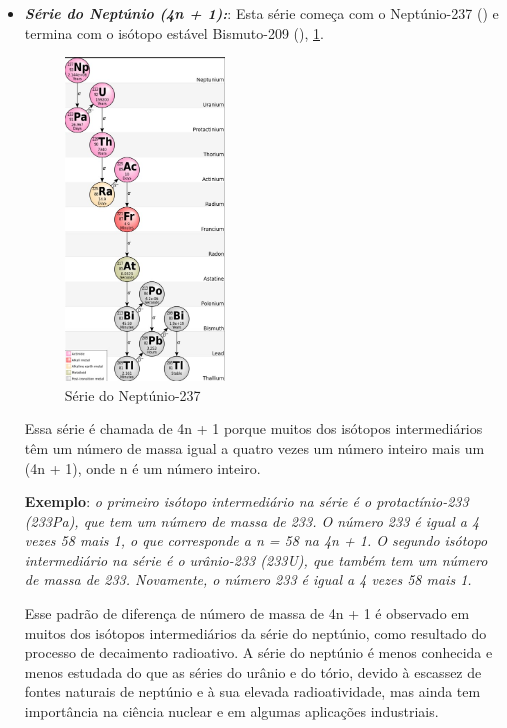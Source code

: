 \documentclass[11pt,a4paper]{article}
\begin{document}
\begin{itemize}
        \item \textbf{\textit{\textcolor{CarnationPink}{Série do Neptúnio (4n + 1):}}}: Esta série começa com o Neptúnio-237 () e termina com o isótopo estável Bismuto-209 (), \ref{fig:serieDoNeptunio}. 
                    
                        \begin{figure}[h]
                            \centering
                            \includegraphics[width=0.4\textwidth]{Imagens/serieDoNeptunio.jpg}
                            \caption{Série do Neptúnio-237}
                            \label{fig:serieDoNeptunio}
                        \end{figure}
                    
        Essa série é chamada de 4n + 1 porque muitos dos isótopos intermediários têm um número de massa igual a quatro vezes um número inteiro mais um (4n + 1), onde n é um número inteiro.
                    
        \textbf{Exemplo}: \textit{ o primeiro isótopo intermediário na série é o protactínio-233 (233Pa), que tem um número de massa de 233. O número 233 é igual a 4 vezes 58 mais 1, o que corresponde a n = 58 na  4n + 1. O segundo isótopo intermediário na série é o urânio-233 (233U), que também tem um número de massa de 233. Novamente, o número 233 é igual a 4 vezes 58 mais 1.}

        Esse padrão de diferença de número de massa de 4n + 1 é observado em muitos dos isótopos intermediários da série do neptúnio, como resultado do processo de decaimento radioativo. A série do neptúnio é menos conhecida e menos estudada do que as séries do urânio e do tório, devido à escassez de fontes naturais de neptúnio e à sua elevada radioatividade, mas ainda tem importância na ciência nuclear e em algumas aplicações industriais.


\end{itemize}
\end{document}
